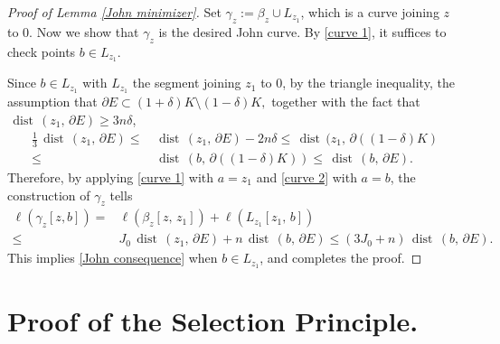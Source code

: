 \documentclass[reqno,11pt]{amsart}
\def\dist{{\mathop\mathrm{\,dist\,}}}
\numberwithin{equation}{section}
\theoremstyle{remark}
\begin{document}
\begin{proof}[Proof of Lemma \ref{John minimizer}]
Set $\gamma_z:=\beta_z\cup L_{z_1}$, which is a curve joining $z$ to $0$. Now we show that $\gamma_z$ is the desired John curve. 
By \eqref{curve 1}, it suffices to check points $b\in L_{z_1}.$







Since $b\in L_{z_1}$ with $L_{z_1}$ the segment joining $z_1$ to $0$, by the triangle inequality, the assumption that $\partial E\subset (1+\delta) K\setminus (1-\delta)K,$ together with the fact that $ \dist(z_1,\,\partial E) \ge  3n\delta$, 
\begin{align*}
    \frac 1 3 \dist(z_1,\,\partial E)\le  & \dist(z_1,\,\partial E)-2 n\delta \le  \dist(z_1,\,\partial((1-\delta)K)\\
    \le & \dist(b,\,\partial((1-\delta)K)) \le \dist(b,\,\partial E).
\end{align*}
 Therefore, by applying \eqref{curve 1} with $a=z_1$ and 
 \eqref{curve 2} with $a=b$, the construction of $\gamma_z$ tells 
\begin{align*} 
   \ell(\gamma_z[z,b])=  & \ell(\beta_z[z,\,z_1])+\ell(L_{z_1}[z_1,\,b])\\
    \le &J_0\dist(z_1,\,\partial E)+n\dist(b,\,\partial E)\le (3J_0+n) \dist(b,\,\partial E). 
\end{align*}
This implies \eqref{John consequence} when $b\in L_{z_1}$, and completes the proof. 
\end{proof}

\medskip




 \appendix
 



 \section{Proof of the Selection Principle.}
\end{document}
